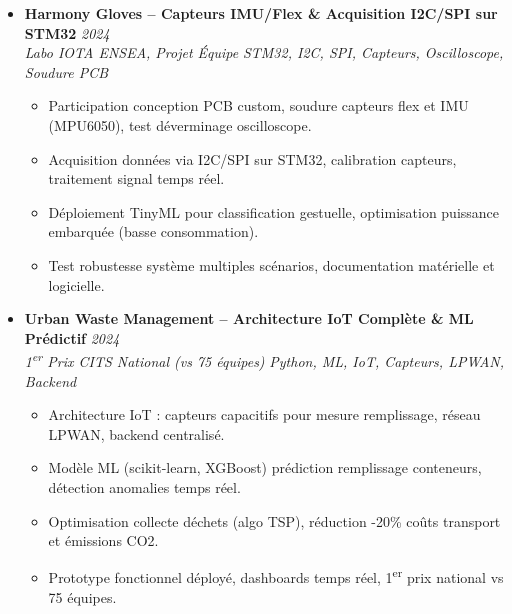 \documentclass[a4paper,11pt]{article}
\begin{document}
\begin{itemize}[leftmargin=*, label={-}]
\begin{itemize}[leftmargin=0.4cm, nosep, label=\tiny$\bullet$]
        \end{itemize}
    \vspace{3pt}
    \item \textbf{Harmony Gloves -- Capteurs IMU/Flex \& Acquisition I2C/SPI sur STM32} \hfill \textit{2024} \\
    \textit{Labo IOTA ENSEA, Projet \'Equipe} \hfill \textit{STM32, I2C, SPI, Capteurs, Oscilloscope, Soudure PCB}
    \vspace{-2pt}
        \begin{itemize}[leftmargin=0.4cm, nosep, label=\tiny$\bullet$]
            \item \small{Participation conception PCB custom, soudure capteurs flex et IMU (MPU6050), test d\'everminage oscilloscope.}
            \item \small{Acquisition donn\'ees via I2C/SPI sur STM32, calibration capteurs, traitement signal temps r\'eel.}
            \item \small{D\'eploiement TinyML pour classification gestuelle, optimisation puissance embarqu\'ee (basse consommation).}
            \item \small{Test robustesse syst\`eme multiples sc\'enarios, documentation mat\'erielle et logicielle.}
        \end{itemize}
    \vspace{3pt}
    \item \textbf{Urban Waste Management -- Architecture IoT Compl\`ete \& ML Pr\'edictif} \hfill \textit{2024} \\
    \textit{1\textsuperscript{er} Prix CITS National (vs 75 \'equipes)} \hfill \textit{Python, ML, IoT, Capteurs, LPWAN, Backend}
    \vspace{-2pt}
        \begin{itemize}[leftmargin=0.4cm, nosep, label=\tiny$\bullet$]
            \item \small{Architecture IoT : capteurs capacitifs pour mesure remplissage, r\'eseau LPWAN, backend centralis\'e.}
            \item \small{Mod\`ele ML (scikit-learn, XGBoost) pr\'ediction remplissage conteneurs, d\'etection anomalies temps r\'eel.}
            \item \small{Optimisation collecte d\'echets (algo TSP), r\'eduction -20\% co\^uts transport et \'emissions CO2.}
            \item \small{Prototype fonctionnel d\'eploy\'e, dashboards temps r\'eel, 1\textsuperscript{er} prix national vs 75 \'equipes.}
        \end{itemize}

\end{itemize}
\end{document}
